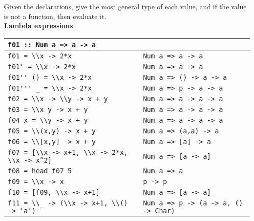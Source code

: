 Given the declarations, give the most general type of each value, and if the value is not a function, then evaluate it.\\
\textbf{Lambda expressions}\\
\begin{tabularx}{\linewidth}{|X|X|}
  \hline
  \lstinline|f01 :: Num a => a -> a| & \\
  \hline
  \lstinline|f01 = \\x -> 2*x| & \lstinline|Num a => a -> a|\\
  \hline
  \lstinline|f01' = \\x -> 2*x| & \lstinline|Num a => a -> a|\\
  \hline
  \lstinline|f01'' () = \\x -> 2*x| & \lstinline|Num a => () -> a -> a|\\
  \hline
  \lstinline|f01''' _ = \\x -> 2*x| & \lstinline|Num a => p -> a -> a|\\
  \hline
  \lstinline|f02 = \\x -> \\y -> x + y| & \lstinline|Num a => a -> a -> a|\\
  \hline
  \lstinline|f03 = \\x y -> x + y| & \lstinline|Num a => a -> a -> a|\\
  \hline
  \lstinline|f04 x = \\y -> x + y| & \lstinline|Num a => a -> a -> a|\\
  \hline
  \lstinline|f05 = \\(x,y) -> x + y| & \lstinline|Num a => (a,a) -> a|\\
  \hline
  \lstinline|f06 = \\[x,y] -> x + y| & \lstinline|Num a => [a] -> a|\\
  \hline
  \lstinline|f07 = [\\x -> x+1, \\x -> 2*x, \\x -> x^2]| & \lstinline|Num a => [a -> a]|\\
  \hline
  \lstinline|f08 = head f07 5| & \lstinline|Num a => a|\\
  \hline
  \lstinline|f09 = \\x -> x| & \lstinline|p -> p|\\
  \hline
  \lstinline|f10 = [f09, \\x -> x+1]| & \lstinline|Num a => [a -> a]|\\
  \hline
  \lstinline|f11 = \\_ -> (\\x -> x+1, \\() -> 'a')| & \lstinline|Num a => p -> (a -> a, () -> Char)|\\
  \hline
\end{tabularx}

